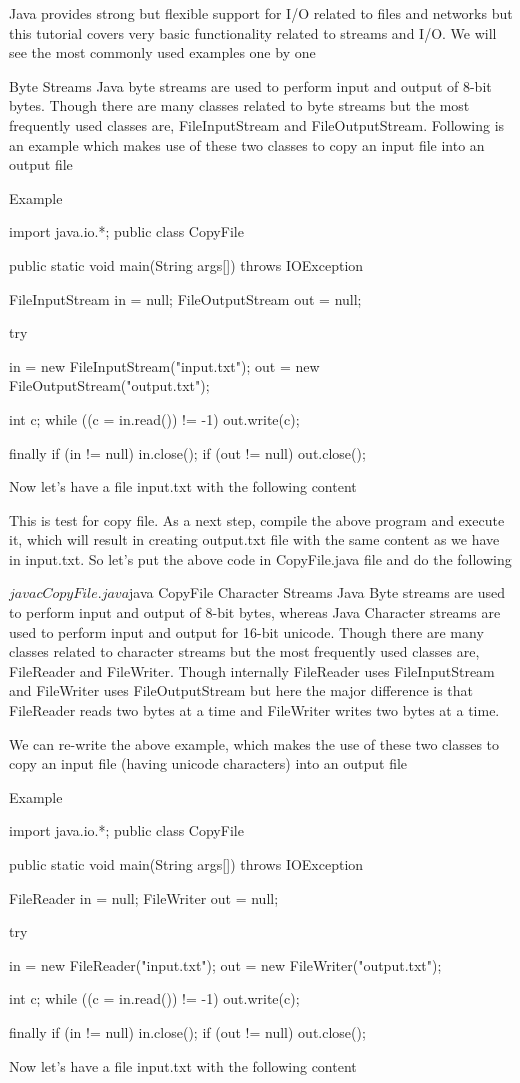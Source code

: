 Java provides strong but flexible support for I/O related to files and networks but this tutorial covers very basic functionality related to streams and I/O. We will see the most commonly used examples one by one

Byte Streams
Java byte streams are used to perform input and output of 8-bit bytes. Though there are many classes related to byte streams but the most frequently used classes are, FileInputStream and FileOutputStream. Following is an example which makes use of these two classes to copy an input file into an output file

Example

import java.io.*;
public class CopyFile {

   public static void main(String args[]) throws IOException {
      FileInputStream in = null;
      FileOutputStream out = null;

      try {
         in = new FileInputStream("input.txt");
         out = new FileOutputStream("output.txt");

         int c;
         while ((c = in.read()) != -1) {
            out.write(c);
         }
      }finally {
         if (in != null) {
            in.close();
         }
         if (out != null) {
            out.close();
         }
      }
   }
}
Now let's have a file input.txt with the following content

This is test for copy file.
As a next step, compile the above program and execute it, which will result in creating output.txt file with the same content as we have in input.txt. So let's put the above code in CopyFile.java file and do the following

$javac CopyFile.java
$java CopyFile
Character Streams
Java Byte streams are used to perform input and output of 8-bit bytes, whereas Java Character streams are used to perform input and output for 16-bit unicode. Though there are many classes related to character streams but the most frequently used classes are, FileReader and FileWriter. Though internally FileReader uses FileInputStream and FileWriter uses FileOutputStream but here the major difference is that FileReader reads two bytes at a time and FileWriter writes two bytes at a time.

We can re-write the above example, which makes the use of these two classes to copy an input file (having unicode characters) into an output file

Example

import java.io.*;
public class CopyFile {

   public static void main(String args[]) throws IOException {
      FileReader in = null;
      FileWriter out = null;

      try {
         in = new FileReader("input.txt");
         out = new FileWriter("output.txt");

         int c;
         while ((c = in.read()) != -1) {
            out.write(c);
         }
      }finally {
         if (in != null) {
            in.close();
         }
         if (out != null) {
            out.close();
         }
      }
   }
}
Now let's have a file input.txt with the following content


